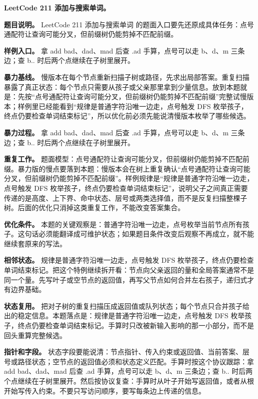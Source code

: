 \noindent\textbf{LeetCode 211 添加与搜索单词。}

\textbf{题目说明。} LeetCode 211 添加与搜索单词 的题面入口要先还原成具体任务：点号通配符让查询可能分叉，但前缀树仍能剪掉不匹配前缀。

\textbf{样例入口。} 拿 add bad、dad、mad 后查 .ad 手算，点号可以走 b、d、m 三条边；查 b.. 时后两个点继续在子树里展开。

\textbf{暴力基线。} 慢版本在每个节点重新扫描子树或路径，先求出局部答案。重复扫描暴露了真正状态：每个节点只需要从孩子或父亲那里拿到少量信息。放到本题就是：先按“点号通配符让查询可能分叉，但前缀树仍能剪掉不匹配前缀”完整试慢版本；样例里已经能看到“规律是普通字符沿唯一边走，点号触发 DFS 枚举孩子，终点仍要检查单词结束标记”，所以优化前必须先能说清慢版本枚举了哪些候选。

\textbf{暴力过程。} 拿 add bad、dad、mad 后查 .ad 手算，点号可以走 b、d、m 三条边；查 b.. 时后两个点继续在子树里展开。

\textbf{重复工作。} 题面模型：点号通配符让查询可能分叉，但前缀树仍能剪掉不匹配前缀。暴力版的慢点要落到本题：慢版本会在树上重复确认“点号通配符让查询可能分叉，但前缀树仍能剪掉不匹配前缀”。样例规律是“规律是普通字符沿唯一边走，点号触发 DFS 枚举孩子，终点仍要检查单词结束标记”，说明父子之间真正需要传递的是高度、上下界、命中状态、层号或两类选择值，而不是反复扫描整棵子树。后面的优化只消掉这类重复工作，不能改变答案集合。

\textbf{优化条件。} 本题的关键观察是：普通字符沿唯一边走，点号枚举当前节点所有孩子。这句话必须能翻译成可维护状态；如果题目条件改变后观察不再成立，就不能继续套原来的写法。

\textbf{相邻状态。} 规律是普通字符沿唯一边走，点号触发 DFS 枚举孩子，终点仍要检查单词结束标记。把这个特例继续拆开看：节点向父亲返回的量和全局答案通常不是同一个量。先写叶子或空节点的返回值，再写父节点如何合并左右孩子，递归式才有边界基础。

\textbf{状态复用。} 把对子树的重复扫描压成返回值或队列状态；每个节点只合并孩子给出的稳定信息。本题落点是：规律是普通字符沿唯一边走，点号触发 DFS 枚举孩子，终点仍要检查单词结束标记。手算时只改被新输入影响的那一小部分，而不是回头重算完整候选。

\textbf{指针和字段。} 状态字段要能说清：节点指针、传入约束或返回值、当前答案、层号或路径状态；空节点的返回值必须和状态定义匹配。手算时按这个协议跟踪：拿 add bad、dad、mad 后查 .ad 手算，点号可以走 b、d、m 三条边；查 b.. 时后两个点继续在子树里展开。然后按协议复查：手算时从叶子开始写返回值，或者从根开始写传入约束。不要只写访问顺序，要写每条边上传递的信息。

